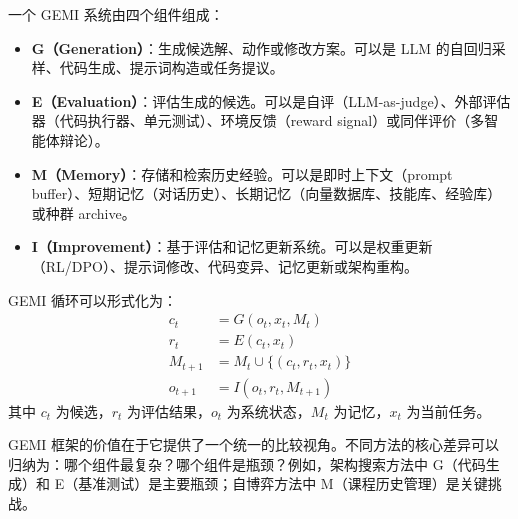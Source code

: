 \begin{definition}
一个 GEMI 系统由四个组件组成：
\begin{itemize}
\item \textbf{G（Generation）}：生成候选解、动作或修改方案。可以是 LLM 的自回归采样、代码生成、提示词构造或任务提议。
\item \textbf{E（Evaluation）}：评估生成的候选。可以是自评（LLM-as-judge）、外部评估器（代码执行器、单元测试）、环境反馈（reward signal）或同伴评价（多智能体辩论）。
\item \textbf{M（Memory）}：存储和检索历史经验。可以是即时上下文（prompt buffer）、短期记忆（对话历史）、长期记忆（向量数据库、技能库、经验库）或种群 archive。
\item \textbf{I（Improvement）}：基于评估和记忆更新系统。可以是权重更新（RL/DPO）、提示词修改、代码变异、记忆更新或架构重构。
\end{itemize}
\end{definition}

GEMI 循环可以形式化为：
\begin{equation}
\begin{aligned}
c_t &= G(o_t, x_t, M_t) \\
r_t &= E(c_t, x_t) \\
M_{t+1} &= M_t \cup \{(c_t, r_t, x_t)\} \\
o_{t+1} &= I(o_t, r_t, M_{t+1})
\end{aligned}
\label{eq:gemi-loop}
\end{equation}
其中 $c_t$ 为候选，$r_t$ 为评估结果，$o_t$ 为系统状态，$M_t$ 为记忆，$x_t$ 为当前任务。

GEMI 框架的价值在于它提供了一个统一的比较视角。不同方法的核心差异可以归纳为：哪个组件最复杂？哪个组件是瓶颈？例如，架构搜索方法中 G（代码生成）和 E（基准测试）是主要瓶颈；自博弈方法中 M（课程历史管理）是关键挑战。

\begin{table}[htbp]
\centering
\caption{六大方法类别在 GEMI 框架下的映射。}
\label{tab:gemi-intro}
\end{table}

